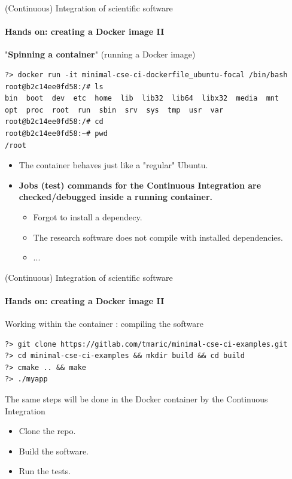 \begin{frame}[fragile]{(Continuous) Integration of scientific software} 
    \framesubtitle{Hands on: creating a Docker image II} 
    \vfill

    "\textbf{Spinning a container}" (running a Docker image) 

    \begin{verbatim}
?> docker run -it minimal-cse-ci-dockerfile_ubuntu-focal /bin/bash
root@b2c14ee0fd58:/# ls
bin  boot  dev  etc  home  lib  lib32  lib64  libx32  media  mnt  
opt  proc  root  run  sbin  srv  sys  tmp  usr  var
root@b2c14ee0fd58:/# cd 
root@b2c14ee0fd58:~# pwd
/root
    \end{verbatim}

    \begin{itemize}
        \item The container behaves just like a "regular" Ubuntu. 
        \item \textbf{Jobs (test) commands for the Continuous Integration are checked/debugged inside a running container.}
            \begin{itemize}
                \item Forgot to install a dependecy.
                \item The research software does not compile with installed dependencies.
                \item ...
            \end{itemize}
    \end{itemize}

\end{frame}


\begin{frame}[fragile]{(Continuous) Integration of scientific software} 
    \framesubtitle{Hands on: creating a Docker image II} 
    \vfill

    Working within the container : compiling the software

    \begin{verbatim}
?> git clone https://gitlab.com/tmaric/minimal-cse-ci-examples.git
?> cd minimal-cse-ci-examples && mkdir build && cd build
?> cmake .. && make
?> ./myapp
    \end{verbatim}

    The same steps will be done in the Docker container by the Continuous Integration  
    \begin{itemize}
        \item Clone the repo. 
        \item Build the software.  
        \item Run the tests. 
    \end{itemize}

\end{frame}


